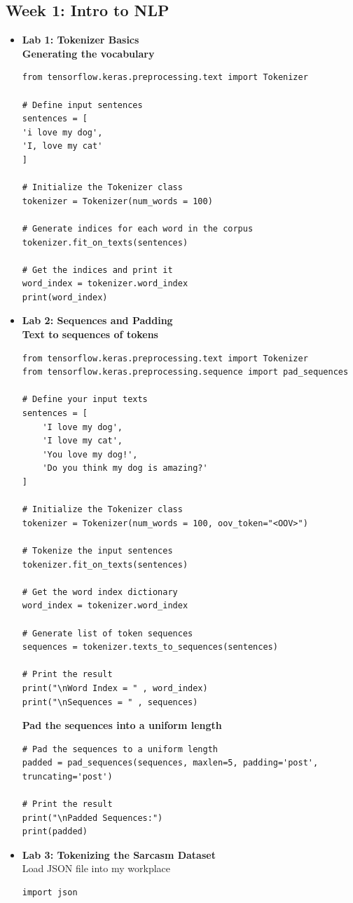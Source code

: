 \documentclass[20pt]{article}
\begin{document}
	\subsection{Week 1: Intro to NLP}
	\begin{itemize}
		\item \textbf{Lab 1: Tokenizer Basics}\\
		\textbf{Generating the vocabulary}
		\begin{verbatim}
from tensorflow.keras.preprocessing.text import Tokenizer

# Define input sentences
sentences = [
'i love my dog',
'I, love my cat'
]

# Initialize the Tokenizer class
tokenizer = Tokenizer(num_words = 100)

# Generate indices for each word in the corpus
tokenizer.fit_on_texts(sentences)

# Get the indices and print it
word_index = tokenizer.word_index
print(word_index)
		\end{verbatim}
		\item \textbf{Lab 2: Sequences and Padding}\\
		\textbf{Text to sequences of tokens}
		\begin{verbatim}
from tensorflow.keras.preprocessing.text import Tokenizer
from tensorflow.keras.preprocessing.sequence import pad_sequences

# Define your input texts
sentences = [
	'I love my dog',
	'I love my cat',
	'You love my dog!',
	'Do you think my dog is amazing?'
]

# Initialize the Tokenizer class
tokenizer = Tokenizer(num_words = 100, oov_token="<OOV>")

# Tokenize the input sentences
tokenizer.fit_on_texts(sentences)

# Get the word index dictionary
word_index = tokenizer.word_index

# Generate list of token sequences
sequences = tokenizer.texts_to_sequences(sentences)

# Print the result
print("\nWord Index = " , word_index)
print("\nSequences = " , sequences)
		\end{verbatim}
		\textbf{Pad the sequences into a uniform length}
		\begin{verbatim}
# Pad the sequences to a uniform length
padded = pad_sequences(sequences, maxlen=5, padding='post', truncating='post')

# Print the result
print("\nPadded Sequences:")
print(padded)
		\end{verbatim}
		\item \textbf{Lab 3: Tokenizing the Sarcasm Dataset}\\
		Load JSON file into my workplace
		\begin{verbatim}
import json


\end{verbatim}
\end{itemize}
\end{document}
